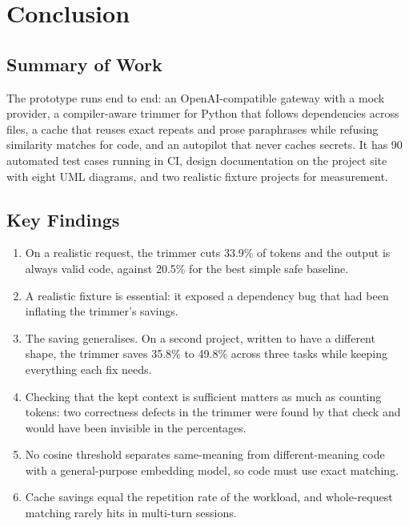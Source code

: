 \documentclass[12pt, a4paper, oneside]{report}
\begin{document}
\chapter{Conclusion}

\section{Summary of Work}

The prototype runs end to end: an OpenAI-compatible gateway with a mock provider,
a compiler-aware trimmer for Python that follows dependencies across files, a
cache that reuses exact repeats and prose paraphrases while refusing similarity
matches for code, and an autopilot that never caches secrets. It has 90
automated test cases running in CI, design documentation on the project site
with eight UML diagrams, and two realistic fixture projects for measurement.

\section{Key Findings}

\begin{enumerate}
    \item On a realistic request, the trimmer cuts 33.9\% of tokens and the output
          is always valid code, against 20.5\% for the best simple safe baseline.
    \item A realistic fixture is essential: it exposed a dependency bug that had
          been inflating the trimmer's savings.
    \item The saving generalises. On a second project, written to have a
          different shape, the trimmer saves 35.8\% to 49.8\% across three
          tasks while keeping everything each fix needs.
    \item Checking that the kept context is sufficient matters as much as
          counting tokens: two correctness defects in the trimmer were found by
          that check and would have been invisible in the percentages.
    \item No cosine threshold separates same-meaning from different-meaning code
          with a general-purpose embedding model, so code must use exact matching.
    \item Cache savings equal the repetition rate of the workload, and whole-request
          matching rarely hits in multi-turn sessions.
\end{enumerate}
\end{document}

